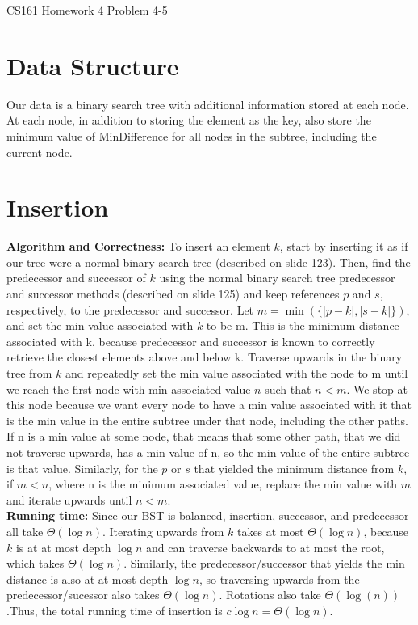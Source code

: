 \documentclass[12pt]{article}
\begin{document}
\begin{center}
{\Large CS161 Homework 4 Problem 4-5}

\end{center}
\section*{Data Structure}
Our data is a binary search tree with additional information stored at each node. At each node, in addition to storing the element as the key, also store the minimum value of MinDifference for all nodes in the subtree, including the current node. 

\section*{Insertion}
\textbf{Algorithm and Correctness:} To insert an element $k$, start by inserting it as if our tree were a normal binary search tree (described on slide 123). Then, find the predecessor and successor of $k$ using the normal binary search tree predecessor and successor methods (described on slide 125) and keep references $p$ and $s$, respectively, to the predecessor and successor. Let $m = \min(\{|p-k|, |s-k|\})$, and set the min value associated with $k$ to be m. This is the minimum distance associated with k, because predecessor and successor is known to correctly retrieve the closest elements above and below k. Traverse upwards in the binary tree from $k$ and repeatedly set the min value associated with the node to m until we reach the first node with min associated value $n$ such that $n < m$. We stop at this node because we want every node to have a min value associated with it that is the min value in the entire subtree under that node, including the other paths. If n is a min value at some node, that means that some other path, that we did not traverse upwards, has a min value of n, so the min value of the entire subtree is that value. Similarly, for the $p$ or $s$ that yielded the minimum distance from $k$, if $m < n$, where n is the minimum associated value, replace the min value with $m$ and iterate upwards until $n < m$.\\
\textbf{Running time:} Since our BST is balanced, insertion, successor, and predecessor all take $\Theta(\log n)$. Iterating upwards from $k$ takes at most $\Theta(\log n)$, because $k$ is at at most depth $\log n$ and can traverse backwards to at most the root, which takes $\Theta(\log n)$. Similarly, the predecessor/successor that yields the min distance is also at at most depth $\log n$, so traversing upwards from the predecessor/sucessor also takes $\Theta(\log n)$. Rotations also take $\Theta(\log(n))$.Thus, the total running time of insertion is $c \log n = \Theta(\log n)$.
\end{document}
